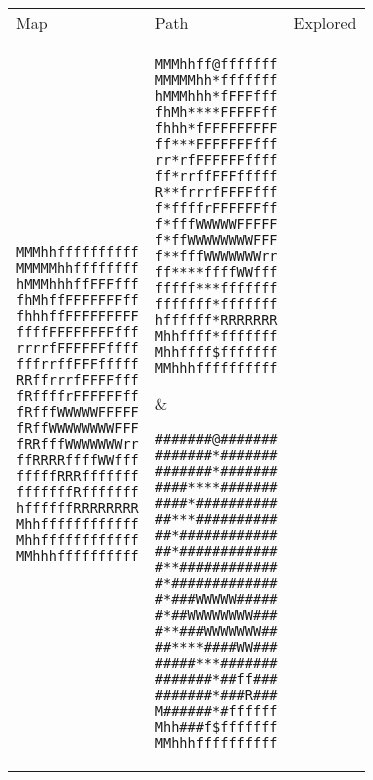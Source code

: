 \documentclass[12pt, article]{scrartcl}
\begin{document}
\begin{tabular}{p{2in} p{2in} p{2in}}
Map & Path & Explored \\

\begin{verbatim}
MMMhhffffffffff
MMMMMhhffffffff
hMMMhhhffFFFfff
fhMhffFFFFFFFff
fhhhffFFFFFFFFF
ffffFFFFFFFFfff
rrrrfFFFFFFffff
fffrrffFFFfffff
RRffrrrfFFFFfff
fRffffrFFFFFFff
fRfffWWWWWFFFFF
fRffWWWWWWWWFFF
fRRfffWWWWWWWrr
ffRRRRffffWWfff
fffffRRRfffffff
fffffffRfffffff
hffffffRRRRRRRR
Mhhffffffffffff
Mhhffffffffffff
MMhhhffffffffff
\end{verbatim}
&
\begin{verbatim}
MMMhhff@fffffff
MMMMMhh*fffffff
hMMMhhh*fFFFfff
fhMh****FFFFFff
fhhh*fFFFFFFFFF
ff***FFFFFFFfff
rr*rfFFFFFFffff
ff*rrffFFFfffff
R**frrrfFFFFfff
f*ffffrFFFFFFff
f*fffWWWWWFFFFF
f*ffWWWWWWWWFFF
f**fffWWWWWWWrr
ff****ffffWWfff
fffff***fffffff
fffffff*fffffff
hffffff*RRRRRRR
Mhhffff*fffffff
Mhhffff$fffffff
MMhhhffffffffff
\end{verbatim}
&
\begin{verbatim}
#######@#######
#######*#######
#######*#######
####****#######
####*##########
##***##########
##*############
##*############
#**############
#*#############
#*###WWWWW#####
#*##WWWWWWWW###
#**###WWWWWWW##
##****####WW###
#####***#######
#######*##ff###
#######*###R###
M######*#ffffff
Mhh###f$fffffff
MMhhhffffffffff
\end{verbatim}
\end{tabular}


\end{document}
